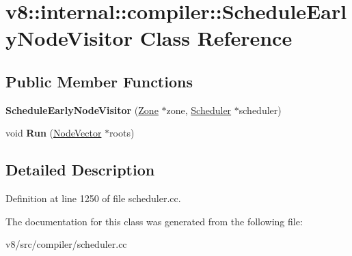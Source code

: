 \hypertarget{classv8_1_1internal_1_1compiler_1_1ScheduleEarlyNodeVisitor}{}\section{v8\+:\+:internal\+:\+:compiler\+:\+:Schedule\+Early\+Node\+Visitor Class Reference}
\label{classv8_1_1internal_1_1compiler_1_1ScheduleEarlyNodeVisitor}
\subsection*{Public Member Functions}
\begin{DoxyCompactItemize}
\item 
\mbox{\label{classv8_1_1internal_1_1compiler_1_1ScheduleEarlyNodeVisitor_a8f23b73985f857c5c15491ec49b807a2}} 
{\bfseries Schedule\+Early\+Node\+Visitor} (\mbox{\hyperlink{classv8_1_1internal_1_1Zone}{Zone}} $\ast$zone, \mbox{\hyperlink{classv8_1_1internal_1_1compiler_1_1Scheduler}{Scheduler}} $\ast$scheduler)
\item 
\mbox{\label{classv8_1_1internal_1_1compiler_1_1ScheduleEarlyNodeVisitor_a5929040cda694a3b3a3ec4bef0894bcf}} 
void {\bfseries Run} (\mbox{\hyperlink{classv8_1_1internal_1_1ZoneVector}{Node\+Vector}} $\ast$roots)
\end{DoxyCompactItemize}


\subsection{Detailed Description}


Definition at line 1250 of file scheduler.\+cc.



The documentation for this class was generated from the following file\+:\begin{DoxyCompactItemize}
\item 
v8/src/compiler/scheduler.\+cc\end{DoxyCompactItemize}
